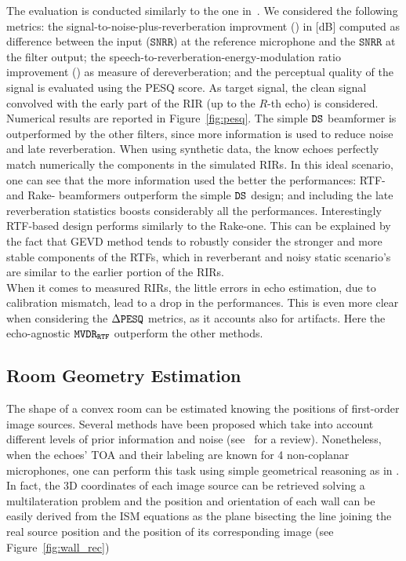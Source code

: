 The evaluation is conducted similarly to the one in~\cite{Kowalczyk2019raking}. We considered the following metrics: the signal-to-noise-plus-reverberation improvment (\DSNRR) in [dB] computed as difference between the input ($\mathtt{SNRR}$) at the reference microphone and the $\mathtt{SNRR}$ at the filter output; the speech-to-reverberation-energy-modulation ratio improvement (\DSRMR)\cite{falk2010non} as measure of dereverberation; and the perceptual quality of the signal is evaluated using the PESQ score.
As target signal, the clean signal convolved with the early part of the RIR (up to the $R$-th echo) is considered.
\\Numerical results are reported in Figure~\ref{fig:pesq}.
The simple $\mathtt{DS}$ beamformer is outperformed by the other filters, since more information is used to reduce noise and late reverberation.
When using synthetic data, the know echoes perfectly match numerically the components in the simulated RIRs. In this ideal scenario, one can see that the more information used the better the performances: RTF- and Rake- beamformers outperform the simple $\mathtt{DS}$ design; and including the late reverberation statistics boosts considerably all the performances.
Interestingly RTF-based design performs similarly to the Rake-one. This can be explained by the fact that GEVD method tends to robustly consider the stronger and more stable components of the RTFs, which in reverberant and noisy static scenario's are similar to the earlier portion of the RIRs.
\\When it comes to measured RIRs, the little errors in echo estimation, due to calibration mismatch, lead to a drop in the performances. This is even more clear when considering the $\Delta\mathtt{PESQ}$ metrics, as it accounts also for artifacts. Here the echo-agnostic $\mathtt{MVDR}_\mathtt{RTF}$ outperform the other methods.



\subsection{Room Geometry Estimation}
The shape of a convex room can be estimated knowing the positions of first-order image sources. Several methods have been proposed which take into account different levels of prior information and noise (see~\cite{remaggi2017acoustic, Crocco2018room} for a review). Nonetheless, when the echoes' TOA and their labeling are known for 4 non-coplanar microphones, one can perform this task using simple geometrical reasoning as in \cite{Dokmanic2013acoustic}. In fact, the 3D coordinates of each image source can be retrieved solving a multilateration problem \cite{Beck2008ExactProblems} and the position and orientation of each wall can be easily derived from the ISM equations as the plane bisecting the line joining the real source position and the position of its corresponding image (see Figure~\ref{fig:wall_rec})

